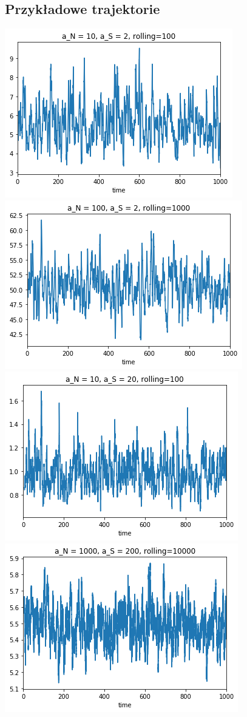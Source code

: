 \documentclass{article}
\begin{document}
\subsection{Przykładowe trajektorie}
\includegraphics{10,2}
\includegraphics{100,2}
\includegraphics{10,20}
\includegraphics{1000,200}
\end{document}
